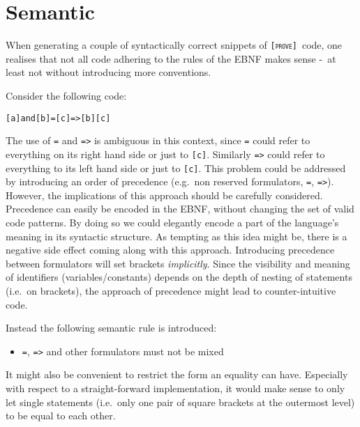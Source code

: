 \documentclass[british]{article}
\newcommand\prv{bc}
\newcommand\m[1]{\texttt{#1}}
\newcommand\name{\texttt{\textsc{[prove]}}}
\begin{document}
\pagebreak{}

\section{Semantic}

When generating a couple of syntactically correct snippets of \name\ code, one
realises that not all code adhering to the rules of the EBNF makes sense -\ at
least not without introducing more conventions.

\medskip{}

Consider the following code:

\begin{verbatim}
[a]and[b]=[c]=>[b][c]
\end{verbatim}

The use of \m{=} and \m{=>} is ambiguous in this context, since \m{=} could
refer to everything on its right hand side or just to \m{[c]}. Similarly \m{=>}
could refer to everything to its left hand side or just to \m{[c]}. This problem
could be addressed by introducing an order of precedence (e.g.\ non reserved
formulators, \m{=}, \m{=>}). However, the implications of this approach should
be carefully considered. Precedence can easily be encoded in the EBNF, without
changing the set of valid code patterns. By doing so we could elegantly encode a
part of the language's meaning in its syntactic structure. As tempting as this
idea might be, there is a negative side effect coming along with this approach.
Introducing precedence between formulators will set brackets \emph{implicitly}.
Since the visibility and meaning of identifiers (variables/constants) depends on
the depth of nesting of statements (i.e.\ on brackets), the approach of
precedence might lead to counter-intuitive code.\newline 

Instead the following semantic rule is introduced:
\begin{itemize}
\item \m{=}, \m{=>} and other formulators must not be mixed \checkmark\
\end{itemize}

\medskip{}

It might also be convenient to restrict the form an equality can have.
Especially with respect to a straight-forward implementation, it would
make sense to only let single statements (i.e.\ only one pair of square
brackets at the outermost level) to be equal to each other.\newline
\end{document}
